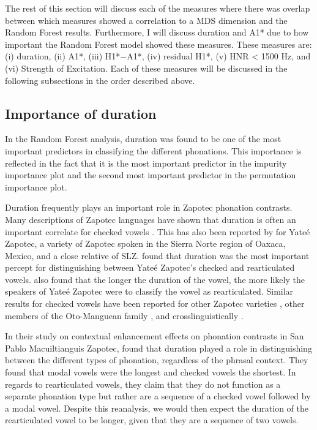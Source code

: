 The rest of this section will discuss each of the measures where there was overlap between which measures showed a correlation to a MDS dimension and the Random Forest results. Furthermore, I will discuss duration and A1* due to how important the Random Forest model showed these measures. These measures are: (i) duration, (ii) A1*, (iii) H1*$-$A1*, (iv)  residual H1*, (v) HNR < 1500 Hz, and (vi) Strength of Excitation. Each of these measures will be discussed in the following subsections in the order described above.

\subsection{Importance of duration} \label{sec:duration_discussion}
In the Random Forest analysis, duration was found to be one of the most important predictors in classifying the different phonations. This importance is reflected in the fact that it is the most important predictor in the impurity importance plot and the second most important predictor in the permutation importance plot. 

Duration frequently plays an important role in Zapotec phonation contrasts. Many descriptions of Zapotec languages have shown that duration is often an important correlate for checked vowels \citep{ariza-garciaPhonationTypesTones2018}. This has also been reported by \citet{chaiPerceptionCheckedRearticulated2025} for Yateé Zapotec, a variety of Zapotec spoken in the Sierra Norte region of Oaxaca, Mexico, and a close relative of SLZ. \citet{chaiPerceptionCheckedRearticulated2025} found that duration was the most important percept for distinguishing between Yateé Zapotec's checked and rearticulated vowels. \citeauthor{chaiPerceptionCheckedRearticulated2025} also found that the longer the duration of the vowel, the more likely the speakers of Yateé Zapotec were to classify the vowel as rearticulated. Similar results for checked vowels have been reported for other Zapotec varieties \citep{arellanesarellanesSistemaFonologicoPropiedades2009,arellanesarellanesDosGradosLaringizacion2010,chavez-peonInteractionMetricalStructure2010,lopeznicolasEstudiosFonologiaGramatica2016,merrillTilquiapanZapotec2008}, other members of the Oto-Manguean family \citep[e.g.,][]{campbellAspectsPhonologyMorphology2014}, and crosslinguistically \citep{gaoPhonationVariationFunction2022,chaiCheckedSyllablesChecked2022}. 

In their study on contextual enhancement effects on phonation contrasts in San Pablo Macuiltianguis Zapotec, \citet{barzilaiContextdependentPhoneticEnhancement2021} found that duration played a role in distinguishing between the different types of phonation, regardless of the phrasal context. They found that modal vowels were the longest and checked vowels the shortest. In regards to rearticulated vowels, they claim that they do not function as a separate phonation type but rather are a sequence of a checked vowel followed by a modal vowel. Despite this reanalysis, we would then expect the duration of the rearticulated vowel to be longer, given that they are a sequence of two vowels. 

